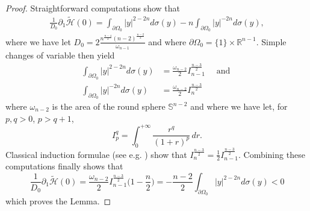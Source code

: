 \documentclass[10pt]{amsart}
\numberwithin{equation}{section}
\newcommand{\R}{\mathbb{R}}
\newcommand{\Om}{\Omega}
\def \th{\widetilde{\mathcal{H}}}
\theoremstyle{plain}
\theoremstyle{remark}
\begin{document}
\begin{proof}
Straightforward computations show that 
$$ \begin{aligned}
\frac{1}{D_0}\partial_1 \th(0) =  \int_{\partial \Om_0} |y|^{2-2n} d \sigma(y) - n \int_{\partial \Om_0} |y|^{-2n} d \sigma(y) ,
\end{aligned} $$
where we have let $D_0 = 2\frac{n^{\frac{n-4}{2}}(n-2)^{\frac{n-2}{2}}}{\omega_{n-1}}$ and where $\partial \Om_0 = \{1\} \times \R^{n-1}$. Simple changes of variable then yield
$$\begin{aligned}   
 \int_{\partial \Om_0} |y|^{2-2n} d \sigma(y) & = \frac{\omega_{n-2}}{2} I_{n-1}^{\frac{n-3}{2}} \quad \text{ and } \\
 \int_{\partial \Om_0} |y|^{-2n} d \sigma(y)& = \frac{\omega_{n-2}}{2} I_{n}^{\frac{n-3}{2}}
\end{aligned} $$ 
where $\omega_{n-2}$ is the area of the round sphere $\mathbb{S}^{n-2}$ and where we have let, for $p,q >0$, $p > q+1$, 
$$ I_p^q = \int_0^{+ \infty}\frac{r^q}{(1+r)^p} \, dr. $$
Classical induction formulae (see e.g. \cite{AubinYamabe}) show that $I_{n}^{\frac{n-3}{2}} = \frac12 I_{n-1}^{\frac{n-3}{2}}$. Combining these computations finally shows that 
$$\frac{1}{D_0}\partial_1 \th(0)  = \frac{\omega_{n-2}}{2} I_{n-1}^{\frac{n-3}{2}} \Big( 1 - \frac{n}{2} \Big) =  - \frac{n-2}{2}   \int_{\partial \Om_0} |y|^{2-2n} d \sigma(y)  < 0$$
which proves the Lemma.
\end{proof}

  


\end{document}

